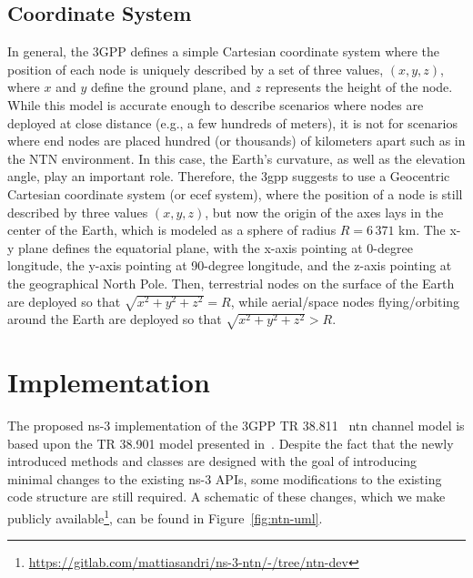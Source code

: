 \subsection{Coordinate System}
\label{sec:coord_model}
In general, the 3GPP defines a simple Cartesian coordinate system where the position of each node is uniquely described by a set of three values, $(x,y,z)$, where $x$ and $y$ define the ground plane, and $z$ represents the height of the node. 
While this model is accurate enough to describe scenarios where nodes are deployed at close distance (e.g., a few hundreds of meters), it is not for scenarios where end nodes are placed hundred (or thousands) of kilometers apart such as in the NTN environment. In this case, the Earth's curvature, as well as the elevation angle, play an important role.
Therefore, the \gls{3gpp} suggests to use a Geocentric Cartesian coordinate system (or \gls{ecef} system), where the position of a node is still described by three values $(x,y,z)$, but now the origin of the axes lays in the center of the Earth, which is modeled as a sphere of radius $R=6\,371$ km. 
The x-y plane defines the equatorial plane, with the x-axis pointing at 0-degree longitude, the y-axis pointing at 90-degree longitude, and the z-axis pointing at the geographical North Pole. 
Then, terrestrial nodes on the surface of the Earth are deployed so that $\sqrt{x^{2}+y^{2}+z^{2}}=R$, while aerial/space nodes flying/orbiting around the Earth are deployed so that $\sqrt{x^{2}+y^{2}+z^{2}}> R$.


\section{Implementation}
\label{sec:implementation}
The proposed ns-3 implementation of the 3GPP TR 38.811~\cite{38811} \gls{ntn} channel model is based upon the TR 38.901 model presented in~\cite{zugno20implementation}. Despite the fact that the newly introduced methods and classes are designed with the goal of introducing minimal changes to the existing ns-3 APIs, %
some modifications to the existing code structure are still required. A schematic of these changes, which we make publicly available\footnote{\url{https://gitlab.com/mattiasandri/ns-3-ntn/-/tree/ntn-dev}}, can be found in Figure~\ref{fig:ntn-uml}.

